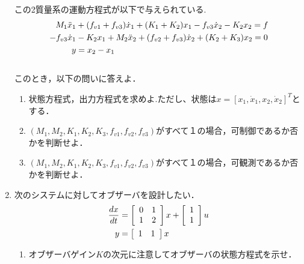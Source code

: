 \begin{multicols}{2}
\begin{enumerate}
この2質量系の運動方程式が以下で与えられている. \\[-0.3cm]
{\footnotesize
\begin{align*} 
\hspace*{-10mm}
M_1 \ddot{x}_1&+(f_{v1}+f_{v3} ) \dot{x}_1+(K_1+K_2 ) x_1-f_{v3} \dot{x}_2-K_2 x_2=f\\
-f_{v3} \dot{x}_1&-K_2 x_1+M_2 \ddot{x}_2+(f_{v2}+f_{v3} ) \dot{x}_2+(K_2+K_3 ) x_2=0\\
 y &= x_2 - x_1
 \end{align*} 
}\\[-0.5cm]
このとき，以下の問いに答えよ．\\[-0.5cm]
\begin{enumerate}
\item 
状態方程式，出力方程式を求めよ.ただし、状態は$x = [x_1, \dot{x}_1, x_2, \dot{x}_2]^T$とする．
\vspace{7cm}
\item
$(M_1, M_2, K_1, K_2, K_3, f_{v1}, f_{v2}, f_{v3})$がすべて１の場合，可制御であるか否かを判断せよ．
\vspace*{5cm}
\item 
$(M_1, M_2, K_1, K_2, K_3, f_{v1}, f_{v2}, f_{v3})$がすべて１の場合，可観測であるか否かを判断せよ．
\vspace{5cm}

\end{enumerate}




\item
次のシステムに対してオブザーバを設計したい．
\begin{align}
	\frac{dx}{dt}
	&=	\bmatrix{cc}
			0 & 1 \\
			1 & 2
		\ematrix
		x
		+
		\bmatrix{c}
			1 \\
			1 
		\ematrix
		u
\nonumber \\
	y 
	&=	\bmatrix{cc}
			1 & 1 
		\ematrix
		x
\nonumber 
\end{align}

\begin{enumerate}

\item 
オブザーバゲイン$K$の次元に注意してオブザーバの状態方程式を示せ．
\vspace{4cm}


\end{enumerate}
\end{enumerate}
\end{multicols}
